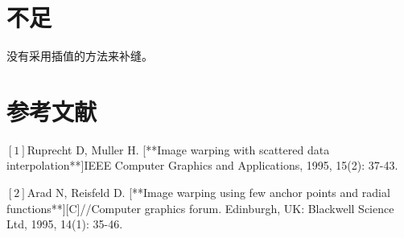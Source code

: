 \documentclass{article}
\begin{document}



	\section{不足}
	没有采用插值的方法来补缝。
\section{参考文献}
  $[1]$Ruprecht D, Muller H. [**Image warping with scattered data 
  interpolation**]IEEE Computer Graphics and Applications, 1995, 15(2): 37-43.
  
  $[2]$Arad N, Reisfeld D. [**Image warping using few anchor points and radial 
  functions**][C]//Computer graphics forum. Edinburgh, UK: Blackwell Science 
  Ltd, 1995, 14(1): 35-46.
\end{document}
